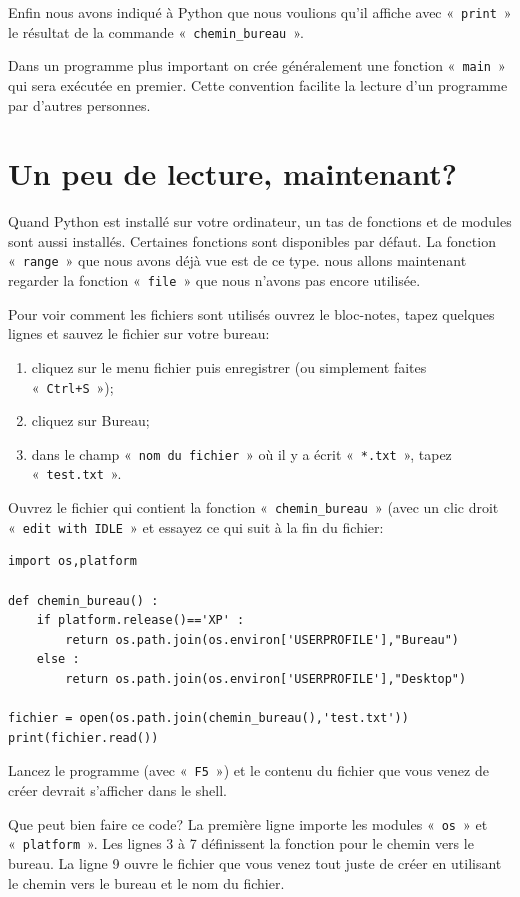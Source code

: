 Enfin nous avons indiqué à Python que nous voulions qu'il affiche avec « \texttt{print} » le résultat de la commande « \texttt{chemin\_bureau} ».

Dans un programme plus important on crée généralement une fonction « \texttt{main} » qui sera exécutée en premier. Cette convention facilite la lecture d'un programme par d'autres personnes.

\section{Un peu de lecture, maintenant?}
Quand Python est installé sur votre ordinateur, un tas de fonctions et de modules sont aussi installés. Certaines fonctions sont disponibles par défaut. La fonction « \texttt{range} » que nous avons déjà vue est de ce type. nous allons maintenant regarder la fonction « \texttt{file} » que nous n'avons pas encore utilisée.

Pour voir comment les fichiers sont utilisés ouvrez le bloc-notes, tapez quelques lignes et sauvez le fichier sur votre bureau:
\begin{enumerate}
\item cliquez sur le menu fichier puis enregistrer (ou simplement faites « \texttt{Ctrl+S} »);
\item cliquez sur Bureau;
\item dans le champ « \texttt{nom du fichier} » où il y a écrit « \texttt{*.txt} », tapez « \texttt{test.txt} ».
\end{enumerate}

Ouvrez le fichier qui contient la fonction « \texttt{chemin\_bureau} » (avec un clic droit « \texttt{edit with IDLE} » et essayez ce qui suit à la fin du fichier:
\begin{Verbatim}[frame=single,rulecolor=\color{mbleu}, label=à taper]
import os,platform

def chemin_bureau() :
    if platform.release()=='XP' :
        return os.path.join(os.environ['USERPROFILE'],"Bureau")
    else :
        return os.path.join(os.environ['USERPROFILE'],"Desktop")
    
fichier = open(os.path.join(chemin_bureau(),'test.txt'))
print(fichier.read())
\end{Verbatim}

Lancez le programme (avec « \texttt{F5} ») et le contenu du fichier que vous venez de créer devrait s'afficher dans le shell. 

Que peut bien faire ce code? La première ligne importe les modules « \texttt{os} »  et « \texttt{platform} ». Les lignes 3 à 7 définissent la fonction pour le chemin vers le bureau.
La ligne 9 ouvre le fichier que vous venez tout juste de créer en utilisant le chemin vers le bureau et le nom du fichier.

